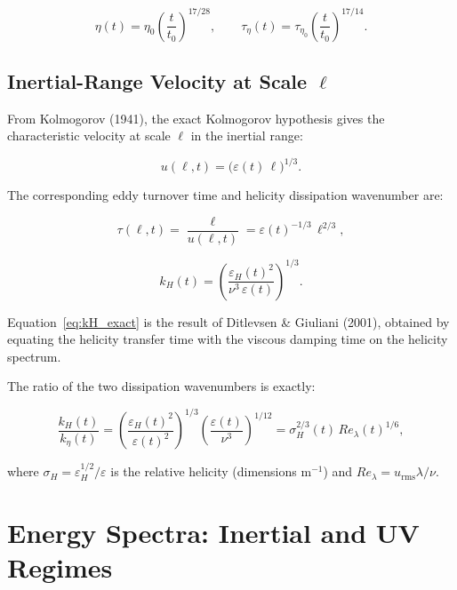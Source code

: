 \documentclass[12pt,a4paper]{article}
\newcommand{\eps}{\varepsilon}
\newcommand{\epsh}{\varepsilon_{H}}
\newcommand{\keta}{k_{\eta}}
\newcommand{\kH}{k_{H}}
\newcommand{\taueta}{\tau_{\eta}}
\newcommand{\tauetaz}{\tau_{\eta_0}}
\newcommand{\Relambda}{Re_{\lambda}}
\theoremstyle{plain}
\theoremstyle{definition}
\begin{document}
\begin{equation}
  \boxed{
  \eta(t) = \eta_0 \left(\frac{t}{t_0}\right)^{17/28},\qquad
  \taueta(t) = \tauetaz \left(\frac{t}{t_0}\right)^{17/14}.
  }
  \label{eq:eta_batchelor}
\end{equation}

\subsection{Inertial-Range Velocity at Scale $\ell$}

From Kolmogorov (1941), the exact Kolmogorov hypothesis gives the
characteristic velocity at scale $\ell$ in the inertial range:

\begin{equation}
  u(\ell,t) = \bigl(\eps(t)\,\ell\bigr)^{1/3}.
  \label{eq:u_kolmogorov}
\end{equation}

The corresponding eddy turnover time and helicity dissipation
wavenumber are:

\begin{equation}
  \tau(\ell,t) = \frac{\ell}{u(\ell,t)} = \eps(t)^{-1/3}\,\ell^{2/3},
  \label{eq:tau_eddy}
\end{equation}

\begin{equation}
  \kH(t) = \left(\frac{\epsh(t)^2}{\nu^3\,\eps(t)}\right)^{1/3}.
  \label{eq:kH_exact}
\end{equation}

Equation~\eqref{eq:kH_exact} is the result of Ditlevsen \& Giuliani
(2001), obtained by equating the helicity transfer time with the
viscous damping time on the helicity spectrum.

The ratio of the two dissipation wavenumbers is exactly:

\begin{equation}
  \frac{\kH(t)}{\keta(t)}
  = \left(\frac{\epsh(t)^2}{\eps(t)^2}\right)^{1/3}
    \left(\frac{\eps(t)}{\nu^3}\right)^{1/12}
  = \sigma_H^{2/3}(t)\,\Relambda(t)^{1/6},
  \label{eq:kH_keta_ratio}
\end{equation}

where $\sigma_H = \epsh^{1/2}/\eps$ is the relative helicity (dimensions
$\mathrm{m}^{-1}$) and $\Relambda = u_{\mathrm{rms}}\lambda/\nu$.

\section{Energy Spectra: Inertial and UV Regimes}
\label{sec:spectra}
\end{document}
